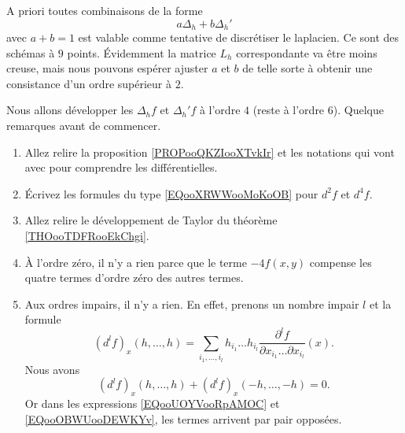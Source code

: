 A priori toutes combinaisons de la forme
\begin{equation}
    a\Delta_h+b\Delta_h'
\end{equation}
avec \( a+b=1\) est valable comme tentative de discrétiser le laplacien. Ce sont des schémas à \( 9\) points. Évidemment la matrice \( L_h\) correspondante va être moins creuse, mais nous pouvons espérer ajuster \( a\) et \( b\) de telle sorte à obtenir une consistance d'un ordre supérieur à \( 2\).

Nous allons développer les \( \Delta_hf\) et \( \Delta_h'f\) à l'ordre \( 4\) (reste à l'ordre \( 6\)). Quelque remarques avant de commencer. 
\begin{enumerate}
    \item
        Allez relire la proposition \ref{PROPooQKZIooXTvkIr} et les notations qui vont avec pour comprendre les différentielles.
    \item
        Écrivez les formules du type \eqref{EQooXRWWooMoKoOB} pour \( d^2f\) et \( d^4f\).
    \item
        Allez relire le développement de Taylor du théorème \ref{THOooTDFRooEkChgi}.
    \item
        À l'ordre zéro, il n'y a rien parce que le terme \( -4f(x,y)\) compense les quatre termes d'ordre zéro des autres termes.
    \item
        Aux ordres impairs, il n'y a rien. En effet, prenons un nombre impair \( l\) et la formule
        \begin{equation}
            (d^lf)_x(h,\ldots, h)=\sum_{i_1,\ldots, i_l}h_{i_1}\ldots h_{i_l}\frac{ \partial^lf }{ \partial x_{i_1}\ldots \partial x_{i_l} }(x).
        \end{equation}
        Nous avons 
        \begin{equation}
            (d^lf)_x(h,\ldots, h)+(d^lf)_x(-h,\ldots, -h)=0.
        \end{equation}
        Or dans les expressions \eqref{EQooUOYVooRpAMOC} et \eqref{EQooOBWUooDEWKYv}, les termes arrivent par pair opposées.
\end{enumerate}

